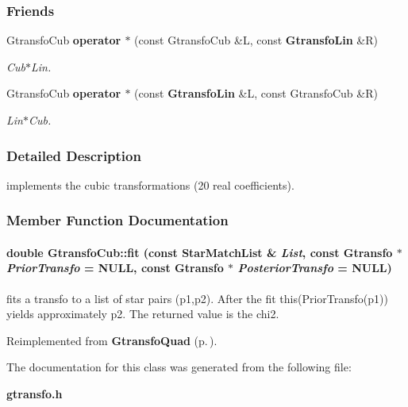 \subsubsection*{Friends}
\begin{CompactItemize}
\item 
{}
Gtransfo\-Cub {\bf operator $\ast$} (const Gtransfo\-Cub \&L, const {\bf Gtransfo\-Lin} \&R)\label{class_gtransfocub_l0}

\begin{CompactList}\small\item\em Cub$\ast$Lin.\item\end{CompactList}\item 
{}
Gtransfo\-Cub {\bf operator $\ast$} (const {\bf Gtransfo\-Lin} \&L, const Gtransfo\-Cub \&R)\label{class_gtransfocub_l1}

\begin{CompactList}\small\item\em Lin$\ast$Cub.\item\end{CompactList}\end{CompactItemize}


\subsubsection{Detailed Description}
implements the cubic transformations (20 real coefficients).



\subsubsection{Member Function Documentation}
\paragraph{\setlength{\rightskip}{0pt plus 5cm}double Gtransfo\-Cub::fit (const Star\-Match\-List \& {\em List}, const {\bf Gtransfo} $\ast$ {\em Prior\-Transfo} = NULL, const {\bf Gtransfo} $\ast$ {\em Posterior\-Transfo} = NULL)\hspace{0.3cm}{\tt  [virtual]}}\hfill\label{class_gtransfocub_a6}


fits a transfo to a list of star pairs (p1,p2). After the fit this(Prior\-Transfo(p1)) yields approximately p2. The returned value is the chi2. 

Reimplemented from {\bf Gtransfo\-Quad} {\rm (p.\,\pageref{class_gtransfoquad_a5})}.

The documentation for this class was generated from the following file:\begin{CompactItemize}
\item 
{\bf gtransfo.h}\end{CompactItemize}
